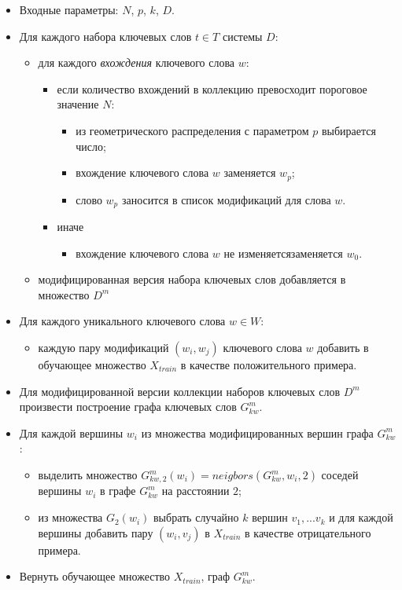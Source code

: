 \begin{itemize}
    \item Входные параметры: $N$, $p$, $k$, $D$.
    \item Для каждого набора ключевых слов $t \in T$ системы $D$:
        \begin{itemize}
            \item для каждого \textit{вхождения} ключевого слова $w$:
                \begin{itemize}
                    \item если количество вхождений в коллекцию превосходит пороговое значение $N$:
                        \begin{itemize}
                            \item из геометрического распределения с параметром $p$ выбирается число;
                            \item вхождение ключевого слова $w$ заменяется $w_p$;
                            \item слово $w_p$ заносится в список модификаций для слова $w$.
                        \end{itemize}
                    \item иначе
                        \begin{itemize}
                            \item вхождение ключевого слова $w$ не изменяетсязаменяется $w_0$.
                        \end{itemize}
                \end{itemize}
            \item модифицированная версия набора ключевых слов добавляется в множество $D^{m}$
        \end{itemize}
    \item Для каждого уникального ключевого слова $w \in W$:
        \begin{itemize}
            \item каждую пару модификаций $(w_i, w_j)$ ключевого слова $w$ добавить в обучающее множество $X_{train}$ в качестве положительного примера.
        \end{itemize}
    \item Для модифицированной версии коллекции наборов ключевых слов $D^{m}$ произвести построение графа ключевых слов $G^m_{kw}$.
    \item Для каждой вершины $w_i$ из множества модифицированных вершин графа $G^m_{kw}$:
        \begin{itemize}
            \item выделить множество  $G^m_{kw, 2}(w_i) = neigbors(G^{m}_{kw}, w_i, 2)$ соседей вершины $w_i$ в графе $G^{m}_{kw}$ на расстоянии $2$;
            \item из множества $G_{2}(w_i)$ выбрать случайно $k$ вершин $v_1, ... v_k$ и для каждой вершины добавить пару $(w_i, v_j)$ в $X_{train}$ в качестве отрицательного примера.
        \end{itemize}
    \item Вернуть обучающее множество $X_{train}$, граф $G^{m}_{kw}$.
\end{itemize}

